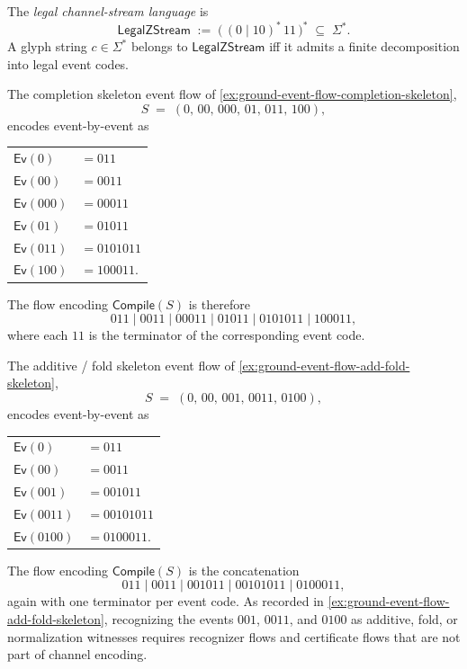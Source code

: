\begin{definition}
\label{def:channel-encoding-legal-zstream}
The \emph{legal channel-stream language} is
$$
  \mathsf{LegalZStream}
  \;:=\;
  \big(\, (0 \mid 10)^{*}\,11 \,\big)^{*}
  \;\subseteq\; \Sigma^{*}.
$$
A glyph string $c \in \Sigma^{*}$ belongs to $\mathsf{LegalZStream}$ iff it admits a finite decomposition into legal event codes.
\end{definition}

\begin{example}
\label{ex:channel-encoding-completion-skeleton}
The completion skeleton event flow of \autoref{ex:ground-event-flow-completion-skeleton},
$$
  S \;=\; (0,\, 00,\, 000,\, 01,\, 011,\, 100),
$$
encodes event-by-event as
\begin{center}
\begin{tabular}{ll}
  $\mathsf{Ev}(0)$    & $= 011$ \\
  $\mathsf{Ev}(00)$   & $= 0011$ \\
  $\mathsf{Ev}(000)$  & $= 00011$ \\
  $\mathsf{Ev}(01)$   & $= 01011$ \\
  $\mathsf{Ev}(011)$  & $= 0101011$ \\
  $\mathsf{Ev}(100)$  & $= 100011$.
\end{tabular}
\end{center}
The flow encoding $\mathsf{Compile}(S)$ is therefore
$$
  011 \mid 0011 \mid 00011 \mid 01011 \mid 0101011 \mid 100011,
$$
where each $11$ is the terminator of the corresponding event code.
\end{example}

\begin{example}
\label{ex:channel-encoding-add-fold-skeleton}
The additive / fold skeleton event flow of \autoref{ex:ground-event-flow-add-fold-skeleton},
$$
  S \;=\; (0,\, 00,\, 001,\, 0011,\, 0100),
$$
encodes event-by-event as
\begin{center}
\begin{tabular}{ll}
  $\mathsf{Ev}(0)$     & $= 011$ \\
  $\mathsf{Ev}(00)$    & $= 0011$ \\
  $\mathsf{Ev}(001)$   & $= 001011$ \\
  $\mathsf{Ev}(0011)$  & $= 00101011$ \\
  $\mathsf{Ev}(0100)$  & $= 0100011$.
\end{tabular}
\end{center}
The flow encoding $\mathsf{Compile}(S)$ is the concatenation
$$
  011 \mid 0011 \mid 001011 \mid 00101011 \mid 0100011,
$$
again with one terminator per event code. As recorded in \autoref{ex:ground-event-flow-add-fold-skeleton}, recognizing the events $001$, $0011$, and $0100$ as additive, fold, or normalization witnesses requires recognizer flows and certificate flows that are not part of channel encoding.
\end{example}

